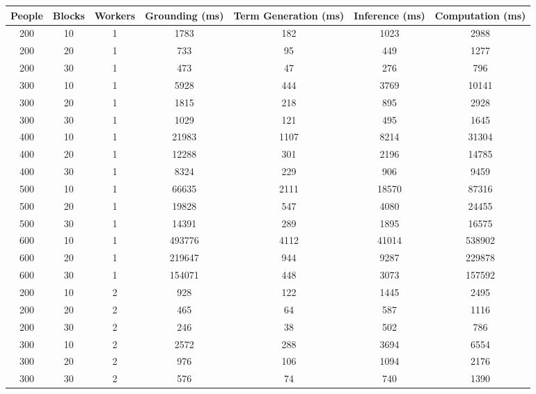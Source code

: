 \documentclass{article}
\begin{document}
    \begin{table}[H]
        \small
        \begin{center}
            \begin{tabular}{| c | c | c | c | c | c | c |}
                \hline
                    People & Blocks & Workers & Grounding (ms) & Term Generation (ms) & Inference (ms) & Computation (ms) \\
                \hline
                    200 & 10 & 1 & 1783 & 182 & 1023 & 2988 \\
                    200 & 20 & 1 & 733 & 95 & 449 & 1277 \\
                    200 & 30 & 1 & 473 & 47 & 276 & 796 \\
                    300 & 10 & 1 & 5928 & 444 & 3769 & 10141 \\
                    300 & 20 & 1 & 1815 & 218 & 895 & 2928 \\
                    300 & 30 & 1 & 1029 & 121 & 495 & 1645 \\
                    400 & 10 & 1 & 21983 & 1107 & 8214 & 31304 \\
                    400 & 20 & 1 & 12288 & 301 & 2196 & 14785 \\
                    400 & 30 & 1 & 8324 & 229 & 906 & 9459 \\
                    500 & 10 & 1 & 66635 & 2111 & 18570 & 87316 \\
                    500 & 20 & 1 & 19828 & 547 & 4080 & 24455 \\
                    500 & 30 & 1 & 14391 & 289 & 1895 & 16575 \\
                    600 & 10 & 1 & 493776 & 4112 & 41014 & 538902 \\
                    600 & 20 & 1 & 219647 & 944 & 9287 & 229878 \\
                    600 & 30 & 1 & 154071 & 448 & 3073 & 157592 \\
                    200 & 10 & 2 & 928 & 122 & 1445 & 2495 \\
                    200 & 20 & 2 & 465 & 64 & 587 & 1116 \\
                    200 & 30 & 2 & 246 & 38 & 502 & 786 \\
                    300 & 10 & 2 & 2572 & 288 & 3694 & 6554 \\
                    300 & 20 & 2 & 976 & 106 & 1094 & 2176 \\
                    300 & 30 & 2 & 576 & 74 & 740 & 1390 \\

\end{tabular}
\end{center}
\end{table}
\end{document}
